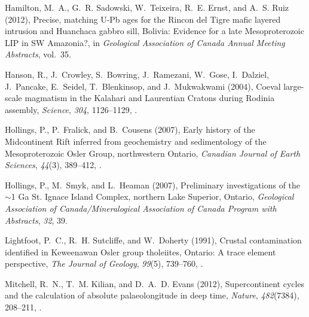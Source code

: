 \documentclass[draft,gc]{AGUTeX}
\begin{document}
\begin{article}
\begin{thebibliography}{24}
Hamilton, M.~A., G.~R. Sadowski, W.~Teixeira, R.~E. Ernst, and A.~S. Ruiz
  (2012), {Precise, matching U-Pb ages for the Rincon del Tigre mafic layered
  intrusion and Huanchaca gabbro sill, Bolivia: Evidence for a late
  Mesoproterozoic LIP in SW Amazonia?}, in \textit{Geological Association of
  Canada Annual Meeting Abstracts}, vol.~35.

Hanson, R., J.~Crowley, S.~Bowring, J.~Ramezani, W.~Gose, I.~Dalziel,
  J.~Pancake, E.~Seidel, T.~Blenkinsop, and J.~Mukwakwami (2004), Coeval
  large-scale magmatism in the {K}alahari and {L}aurentian {C}ratons during
  {R}odinia assembly, \textit{Science}, \textit{304}, 1126--1129,
  .

Hollings, P., P.~Fralick, and B.~Cousens (2007{}), {Early history
  of the Midcontinent Rift inferred from geochemistry and sedimentology of the
  Mesoproterozoic Osler Group, northwestern Ontario}, \textit{Canadian Journal
  of Earth Sciences}, \textit{44}(3), 389--412, .

Hollings, P., M.~Smyk, and L.~Heaman (2007{}), Preliminary
  investigations of the $\sim$1 {Ga St. Ignace Island Complex, northern Lake
  Superior, Ontario}, \textit{Geological Association of Canada/Mineralogical
  Association of Canada Program with Abstracts}, \textit{32}, 39.

Lightfoot, P.~C., R.~H. Sutcliffe, and W.~Doherty (1991), Crustal contamination
  identified in {K}eweenawan {O}sler group tholeiites, {O}ntario: A trace
  element perspective, \textit{The Journal of Geology}, \textit{99}(5),
  739--760, .

Mitchell, R.~N., T.~M. Kilian, and D.~A.~D. Evans (2012), Supercontinent cycles
  and the calculation of absolute palaeolongitude in deep time,
  \textit{Nature}, \textit{482}(7384), 208--211, .


\end{thebibliography}
\end{article}
\end{document}
